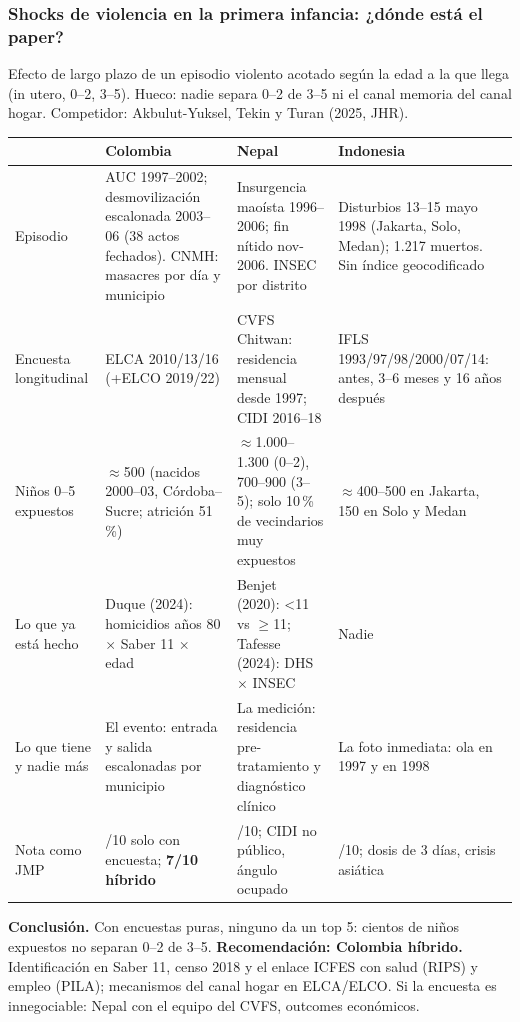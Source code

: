 \documentclass[aspectratio=169,10pt]{beamer}
\begin{document}
\begin{frame}[t]
\frametitle{Shocks de violencia en la primera infancia: ¿dónde está el paper?}
\vspace{-0.2em}
{\scriptsize\color{muted} Efecto de largo plazo de un episodio violento acotado según la edad a la que llega (in utero, 0--2, 3--5). Hueco: nadie separa 0--2 de 3--5 ni el canal memoria del canal hogar. Competidor: Akbulut-Yuksel, Tekin y Turan (2025, JHR).}

\vspace{0.2em}
\renewcommand{\arraystretch}{1.0}
\scriptsize
\begin{tabular}{@{}>{\raggedright\arraybackslash}p{1.7cm}>{\raggedright\arraybackslash}p{4.0cm}>{\raggedright\arraybackslash}p{4.0cm}>{\raggedright\arraybackslash}p{4.0cm}@{}}
\toprule
 & \textbf{Colombia} & \textbf{Nepal} & \textbf{Indonesia} \\
\midrule
Episodio & AUC 1997--2002; desmovilización escalonada 2003--06 (38 actos fechados). CNMH: masacres por día y municipio & Insurgencia maoísta 1996--2006; fin nítido nov-2006. INSEC por distrito & Disturbios 13--15 mayo 1998 (Jakarta, Solo, Medan); 1.217 muertos. Sin índice geocodificado \\
Encuesta longitudinal & ELCA 2010/13/16 (+ELCO 2019/22) & CVFS Chitwan: residencia mensual desde 1997; CIDI 2016--18 & IFLS 1993/97/98/2000/07/14: antes, 3--6 meses y 16 años después \\
Niños 0--5 expuestos & $\approx$500 (nacidos 2000--03, Córdoba--Sucre; atrición 51\,\%) & $\approx$1.000--1.300 (0--2), 700--900 (3--5); solo 10\,\% de vecindarios muy expuestos & $\approx$400--500 en Jakarta, 150 en Solo y Medan \\
Lo que ya está hecho & Duque (2024): homicidios años 80 $\times$ Saber 11 $\times$ edad & Benjet (2020): <11 vs $\geq$11; Tafesse (2024): DHS $\times$ INSEC & Nadie \\
Lo que tiene y nadie más & \textcolor{accent}{El evento}: entrada y salida escalonadas por municipio & \textcolor{accent}{La medición}: residencia pre-tratamiento y diagnóstico clínico & \textcolor{accent}{La foto inmediata}: ola en 1997 y en 1998 \\
Nota como JMP & 4/10 solo con encuesta; \textbf{7/10 híbrido} & 4/10; CIDI no público, ángulo ocupado & 4/10; dosis de 3 días, crisis asiática \\
\bottomrule
\end{tabular}

\vspace{0.35em}
\scriptsize
\textbf{Conclusión.} Con encuestas puras, ninguno da un top 5: cientos de niños expuestos no separan 0--2 de 3--5. \textbf{Recomendación: Colombia híbrido.} Identificación en Saber 11, censo 2018 y el enlace ICFES con salud (RIPS) y empleo (PILA); mecanismos del canal hogar en ELCA/ELCO. Si la encuesta es innegociable: Nepal con el equipo del CVFS, outcomes económicos.
\end{frame}
\end{document}
